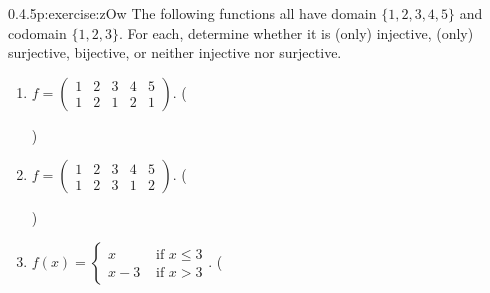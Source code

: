 \documentclass[twoside,11pt,]{book}
\numberwithin{equation}{chapter}
\newcommand{\twoline}[2]{\begin{pmatrix}#1 \\ #2 \end{pmatrix}}
\newcommand{\gt}{>}
\newcommand{\amp}{&}
\begin{document}
\begin{divisionsolution}{0.4.5}{}{p:exercise:zOw}%
The following functions all have domain \(\{1,2,3,4,5\}\) and codomain \(\{1,2,3\}\text{.}\) For each, determine whether it is (only) injective, (only) surjective, bijective, or neither injective nor surjective.%
\begin{enumerate}[label=(\alph*)]
\item{}\(f = \twoline{1 \amp 2 \amp 3 \amp 4 \amp 5}{1 \amp 2 \amp 1 \amp 2 \amp 1}\text{.}\) \quad()\quad
%
\item{}\(f = \twoline{1 \amp 2 \amp 3 \amp 4 \amp 5}{1 \amp 2 \amp 3 \amp 1 \amp 2}\text{.}\) \quad()\quad
%
\item{}\(f(x) = \begin{cases} x \amp \text{ if } x \le 3 \\ x-3 \amp \text{ if } x \gt 3\end{cases}\text{.}\) \quad(
\end{enumerate}
\end{divisionsolution}
\end{document}
